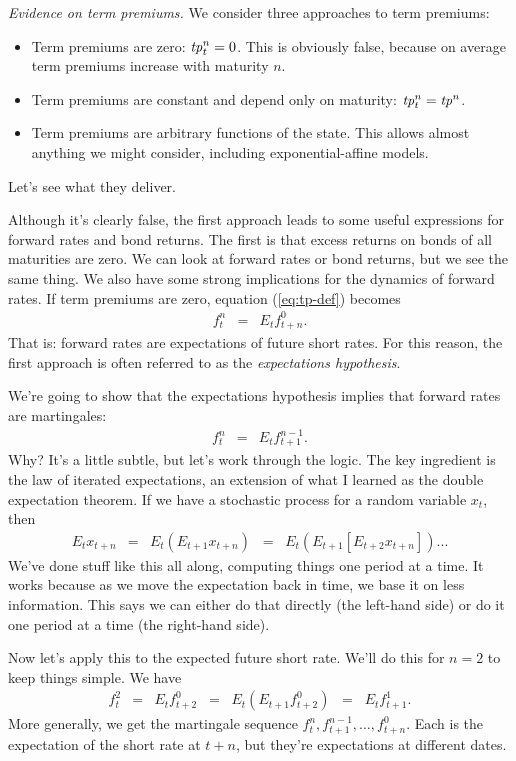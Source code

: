 \documentclass[11pt]{article}
\newcommand{\tp}{\mbox{\it tp\/}}
\begin{document}
{\it Evidence on term premiums.\/}
We consider three approaches to term premiums:
\begin{itemize}
\item Term premiums are zero:  $\tp^n_t = 0$.
This is obviously false, because on average term premiums increase with maturity $n$.
\item Term premiums are constant and depend only on maturity:  $\tp^n_t = \tp^n$.
\item Term premiums are arbitrary functions of the state.
This allows almost anything we might consider, including exponential-affine models.
\end{itemize}
Let's see what they deliver.

Although it's clearly false,
the first approach leads to some useful expressions for forward rates and bond returns.
The first is that excess returns on bonds of all maturities are zero.
We can look at forward rates or bond returns, but we see the same thing.
We also have some strong implications for the dynamics of forward rates.
If term premiums are zero, equation (\ref{eq:tp-def}) becomes
\begin{eqnarray*}
    f^n_t &=&  E_t f^0_{t+n}  .
\end{eqnarray*}
That is:  forward rates are expectations of future short rates.
For this reason, the first approach is often referred to as
the {\it expectations hypothesis\/}.


We're going to show that the expectations hypothesis implies
that forward rates are martingales:
\begin{eqnarray}
    f^n_t &=&  E_t f^{n-1}_{t+1}  .
    \label{eq:forwards-martingale}
\end{eqnarray}
Why?  It's a little subtle, but let's work through the logic.
The key ingredient is the law of iterated expectations,
an extension of what I learned as the double expectation theorem.
If we have a stochastic process for a random variable $x_t$,
then
\begin{eqnarray*}
    E_t x_{t+n} &=& E_t \left( E_{t+1} x_{t+n} \right)
            \;\;=\;\; E_t \left( E_{t+1} [E_{t+2} x_{t+n}] \right) ...
\end{eqnarray*}
We've done stuff like this all along, computing things one period at a time.
It works because as we move the expectation back in time,
we base it on less information.
This says we can either do that directly (the left-hand side)
or do it one period at a time (the right-hand side).

Now let's apply this to the expected future short rate.
We'll do this for $n=2$ to keep things simple.
We have
\begin{eqnarray*}
    f^2_t &=&  E_t f^{0}_{t+2}
            \;\;=\;\; E_t (E_{t+1} f^{0}_{t+2} )
            \;\;=\;\; E_t f^{1}_{t+1}  .
\end{eqnarray*}
More generally, we get the martingale sequence
$f^n_t, f^{n-1}_{t+1}, \ldots , f^{0}_{t+n}$.
Each is the expectation of the short rate at $t+n$,
but they're expectations at different dates.
\end{document}
